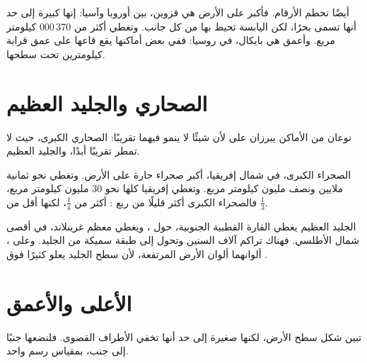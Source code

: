  أيضًا تحطم الأرقام. فأكبر  على الأرض هي  قزوين، بين
أوروبا وآسيا: إنها كبيرة إلى حد أنها تسمى بحرًا، لكن اليابسة تحيط بها من كل
جانب. وتغطي أكثر من
370\,000 كيلومتر مربع. وأعمق  هي  بايكال، في روسيا: ففي
بعض أماكنها يقع قاعها على عمق قرابة كيلومترين تحت سطحها.

\section{الصحاري والجليد العظيم}

نوعان من الأماكن يبرزان على  لأن شيئًا لا ينمو فيهما
تقريبًا: الصحاري الكبرى، حيث لا تمطر تقريبًا أبدًا، والجليد
العظيم.

الصحراء الكبرى، في شمال إفريقيا، أكبر صحراء حارة على الأرض. وتغطي نحو
ثمانية ملايين ونصف مليون كيلومتر مربع. وتغطي إفريقيا كلها نحو 30 مليون
كيلومتر مربع، فالصحراء الكبرى أكثر قليلًا من ربع : أكثر من
$\frac{1}{4}$، لكنها أقل من
$\frac{1}{3}$.

الجليد العظيم يغطي القارة القطبية الجنوبية، حول ، ويغطي معظم
غرينلاند، في أقصى شمال  الأطلسي. فهناك تراكم  آلاف السنين وتحول
إلى طبقة سميكة من الجليد. وعلى ، ألوانهما ألوان الأرض
المرتفعة، لأن سطح الجليد يعلو كثيرًا فوق .

\section{الأعلى والأعمق}

 تبين شكل سطح الأرض، لكنها صغيرة إلى حد أنها تخفي
الأطراف القصوى. فلنضعها جنبًا إلى جنب، بمقياس رسم واحد.

